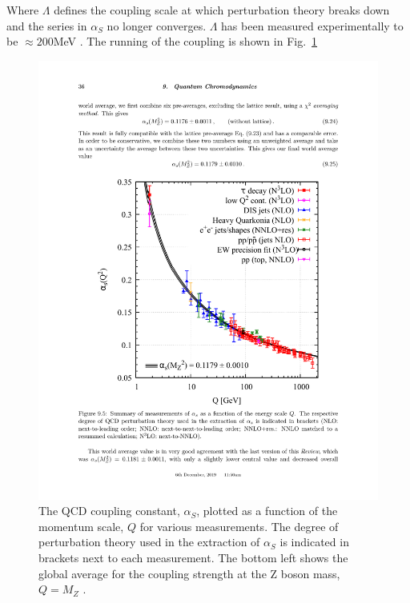   Where $\Lambda$ defines the coupling scale at which perturbation theory breaks down and the series in  $\alpha_S$ no longer converges. $\Lambda$ has been measured experimentally to be  $\approx 200$MeV \cite{Bettini2008}. The running of the coupling is shown in Fig.~\ref{fig:a_S_running}

  \begin{figure}[htpb]
    \centering
    \includegraphics[trim={3.5cm 5.9cm 3cm 7cm},clip,width=1.0\textwidth] {Introduction/a_S_running.pdf}
    \caption{The QCD coupling constant, $\alpha_S$, plotted as a function of the momentum scale,  $Q$ for various measurements. The degree of perturbation theory used in the extraction of  $\alpha_S$ is indicated in brackets next to each measurement. The bottom left shows the global average for the coupling strength at the Z boson mass, $Q=M_Z$ \cite{zotero-314}.}
    \label{fig:a_S_running}
  \end{figure}
  

